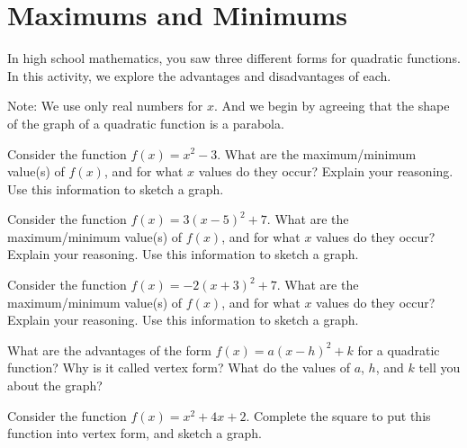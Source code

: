 \newpage
\section{Maximums and Minimums}\label{A:vertex}


%
%

  

In high school mathematics, you saw three different forms for quadratic functions.  In this activity, we explore the advantages and disadvantages of each.  

Note:  We use only real numbers for $x$.  And we begin by agreeing that the shape of the graph of a quadratic function is a parabola.  

\begin{prob}
Consider the function $f(x) = x^2 -3$. What are the maximum/minimum value(s) of $f(x)$, and for what $x$ values do they occur? 
Explain your reasoning.  Use this information to sketch a graph.  
\end{prob}

\begin{prob}
Consider the function $f(x) = 3(x-5)^2 +7$. What are the maximum/minimum value(s) of $f(x)$, and for what $x$ values do they occur? Explain your reasoning.  Use this information to sketch a graph.  
\end{prob}

\begin{prob}
Consider the function $f(x) = -2(x+3)^2 + 7$. What are the maximum/minimum value(s) of $f(x)$, and for what $x$ values do they occur? Explain your reasoning.  Use this information to sketch a graph.  
\end{prob}

\begin{prob}
What are the advantages of the form $f(x) = a(x-h)^2+k$ for a quadratic function?  Why is it called vertex form?  What do the values of $a$, $h$, and $k$ tell you about the graph?  
\end{prob}


\begin{prob}
Consider the function $f(x) = x^2 + 4x + 2$. Complete the square to
put this function into vertex form, and sketch a graph.
\end{prob}

